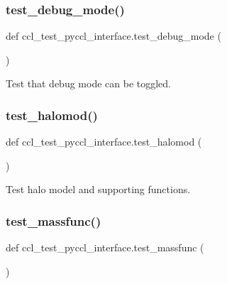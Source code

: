 \subsubsection{\texorpdfstring{test\+\_\+debug\+\_\+mode()}{test\_debug\_mode()}}
{\footnotesize\ttfamily def ccl\+\_\+test\+\_\+pyccl\+\_\+interface.\+test\+\_\+debug\+\_\+mode (\begin{DoxyParamCaption}{ }\end{DoxyParamCaption})}

\begin{DoxyVerb}Test that debug mode can be toggled.
\end{DoxyVerb}
 \mbox{\label{namespaceccl__test__pyccl__interface_a1936b759676e55f5a5c9a339af0bba48}} 
\subsubsection{\texorpdfstring{test\+\_\+halomod()}{test\_halomod()}}
{\footnotesize\ttfamily def ccl\+\_\+test\+\_\+pyccl\+\_\+interface.\+test\+\_\+halomod (\begin{DoxyParamCaption}{ }\end{DoxyParamCaption})}

\begin{DoxyVerb}Test halo model and supporting functions.
\end{DoxyVerb}
 \mbox{\label{namespaceccl__test__pyccl__interface_a7aa32506e6319a810450e886106d3207}} 
\subsubsection{\texorpdfstring{test\+\_\+massfunc()}{test\_massfunc()}}
{\footnotesize\ttfamily def ccl\+\_\+test\+\_\+pyccl\+\_\+interface.\+test\+\_\+massfunc (\begin{DoxyParamCaption}{ }\end{DoxyParamCaption})}

